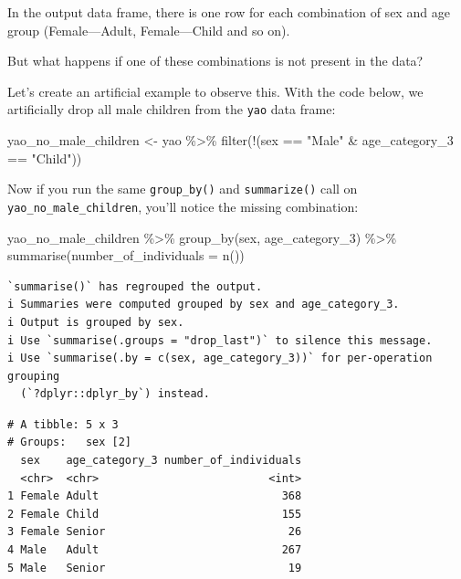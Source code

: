 \documentclass[
  letterpaper,
  DIV=11,
  numbers=noendperiod]{scrreprt}
\newenvironment{Shaded}{\begin{snugshade}}{\end{snugshade}}
\newcommand{\AttributeTok}[1]{\textcolor[rgb]{0.40,0.45,0.13}{#1}}
\newcommand{\FunctionTok}[1]{\textcolor[rgb]{0.28,0.35,0.67}{#1}}
\newcommand{\NormalTok}[1]{\textcolor[rgb]{0.00,0.23,0.31}{#1}}
\newcommand{\OtherTok}[1]{\textcolor[rgb]{0.00,0.23,0.31}{#1}}
\newcommand{\SpecialCharTok}[1]{\textcolor[rgb]{0.37,0.37,0.37}{#1}}
\newcommand{\StringTok}[1]{\textcolor[rgb]{0.13,0.47,0.30}{#1}}
\begin{document}
In the output data frame, there is one row for each combination of sex
and age group (Female---Adult, Female---Child and so on).

But what happens if one of these combinations is not present in the
data?

Let's create an artificial example to observe this. With the code below,
we artificially drop all male children from the \texttt{yao} data frame:

\begin{Shaded}
\begin{Highlighting}[]
\NormalTok{yao\_no\_male\_children }\OtherTok{\textless{}{-}} 
\NormalTok{  yao }\SpecialCharTok{\%\textgreater{}\%} 
  \FunctionTok{filter}\NormalTok{(}\SpecialCharTok{!}\NormalTok{(sex }\SpecialCharTok{==} \StringTok{"Male"} \SpecialCharTok{\&}\NormalTok{ age\_category\_3 }\SpecialCharTok{==} \StringTok{"Child"}\NormalTok{))}
\end{Highlighting}
\end{Shaded}

Now if you run the same \texttt{group\_by()} and \texttt{summarize()}
call on \texttt{yao\_no\_male\_children}, you'll notice the missing
combination:

\begin{Shaded}
\begin{Highlighting}[]
\NormalTok{yao\_no\_male\_children }\SpecialCharTok{\%\textgreater{}\%} 
  \FunctionTok{group\_by}\NormalTok{(sex, age\_category\_3) }\SpecialCharTok{\%\textgreater{}\%} 
  \FunctionTok{summarise}\NormalTok{(}\AttributeTok{number\_of\_individuals =} \FunctionTok{n}\NormalTok{())}
\end{Highlighting}
\end{Shaded}

\begin{verbatim}
`summarise()` has regrouped the output.
i Summaries were computed grouped by sex and age_category_3.
i Output is grouped by sex.
i Use `summarise(.groups = "drop_last")` to silence this message.
i Use `summarise(.by = c(sex, age_category_3))` for per-operation grouping
  (`?dplyr::dplyr_by`) instead.
\end{verbatim}

\begin{verbatim}
# A tibble: 5 x 3
# Groups:   sex [2]
  sex    age_category_3 number_of_individuals
  <chr>  <chr>                          <int>
1 Female Adult                            368
2 Female Child                            155
3 Female Senior                            26
4 Male   Adult                            267
5 Male   Senior                            19
\end{verbatim}
\end{document}
